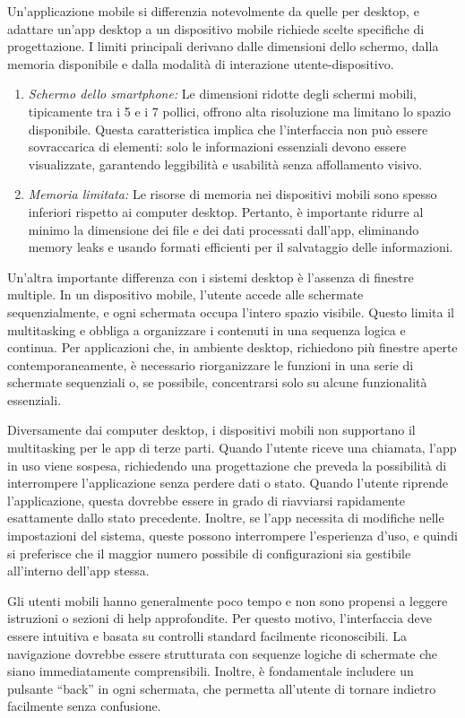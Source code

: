 Un’applicazione mobile si differenzia notevolmente da quelle per desktop, e adattare un'app desktop a un dispositivo mobile richiede scelte specifiche di progettazione. I limiti principali derivano dalle dimensioni dello schermo, dalla memoria disponibile e dalla modalità di interazione utente-dispositivo.
\begin{enumerate}
    \item \textit{Schermo dello smartphone:} Le dimensioni ridotte degli schermi mobili, tipicamente tra i 5 e i 7 pollici, offrono alta risoluzione ma limitano lo spazio disponibile. Questa caratteristica implica che l’interfaccia non può essere sovraccarica di elementi: solo le informazioni essenziali devono essere visualizzate, garantendo leggibilità e usabilità senza affollamento visivo.
    \item \textit{Memoria limitata:} Le risorse di memoria nei dispositivi mobili sono spesso inferiori rispetto ai computer desktop. Pertanto, è importante ridurre al minimo la dimensione dei file e dei dati processati dall’app, eliminando memory leaks e usando formati efficienti per il salvataggio delle informazioni.
\end{enumerate}
Un’altra importante differenza con i sistemi desktop è l’assenza di finestre multiple. In un dispositivo mobile, l’utente accede alle schermate sequenzialmente, e ogni schermata occupa l'intero spazio visibile. Questo limita il multitasking e obbliga a organizzare i contenuti in una sequenza logica e continua. Per applicazioni che, in ambiente desktop, richiedono più finestre aperte contemporaneamente, è necessario riorganizzare le funzioni in una serie di schermate sequenziali o, se possibile, concentrarsi solo su alcune funzionalità essenziali.

Diversamente dai computer desktop, i dispositivi mobili non supportano il multitasking per le app di terze parti. Quando l'utente riceve una chiamata, l'app in uso viene sospesa, richiedendo una progettazione che preveda la possibilità di interrompere l'applicazione senza perdere dati o stato. Quando l'utente riprende l’applicazione, questa dovrebbe essere in grado di riavviarsi rapidamente esattamente dallo stato precedente. Inoltre, se l'app necessita di modifiche nelle impostazioni del sistema, queste possono interrompere l’esperienza d’uso, e quindi si preferisce che il maggior numero possibile di configurazioni sia gestibile all’interno dell'app stessa.

Gli utenti mobili hanno generalmente poco tempo e non sono propensi a leggere istruzioni o sezioni di help approfondite. Per questo motivo, l’interfaccia deve essere intuitiva e basata su controlli standard facilmente riconoscibili. La navigazione dovrebbe essere strutturata con sequenze logiche di schermate che siano immediatamente comprensibili. Inoltre, è fondamentale includere un pulsante “back” in ogni schermata, che permetta all'utente di tornare indietro facilmente senza confusione.

